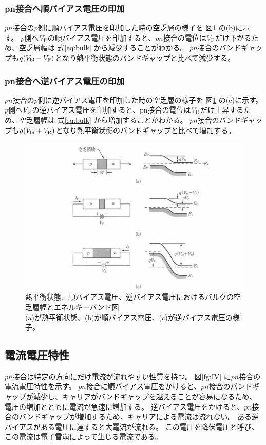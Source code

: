 \subsubsection{pn接合へ順バイアス電圧の印加}
$pn$接合の$p$側に順バイアス電圧を印加した時の空乏層の様子を 図\ref{fg:pn_bias} の(b)に示す。
$p$側へ$V_{\rm{F}}$の順バイアス電圧を印加すると、$pn$接合の電位は$V_{\rm{F}}$だけ下がるため、空乏層幅は 式\ref{eq:bulk} から減少することがわかる。
$pn$接合のバンドギャップも$q(V_{\rm{bi}}-V_{\rm{F}})$となり熱平衡状態のバンドギャップと比べて減少する。

\subsubsection{pn接合へ逆バイアス電圧の印加}
$pn$接合の$p$側に逆バイアス電圧を印加した時の空乏層の様子を 図\ref{fg:pn_bias} の(c)に示す。
$p$側へ$V_{\rm{R}}$の逆バイアス電圧を印加すると、pn接合の電位は$V_{\rm{R}}$だけ上昇するため、空乏層幅は 式\ref{eq:bulk} から増加することがわかる。
$pn$接合のバンドギャップも$q(V_{\rm{bi}}+V_{\rm{R}})$となり熱平衡状態のバンドギャップと比べて増加する。

\begin{figure}[h]
    \centering
    \includegraphics[width=12cm]{fig/ch2/pn_bias.jpg}
    \caption[熱平衡状態、順バイアス電圧、逆バイアス電圧におけるバルクの空乏層幅とエネルギーバンド図\cite{sze2012semiconductor}]{熱平衡状態、順バイアス電圧、逆バイアス電圧におけるバルクの空乏層幅とエネルギーバンド図\cite{sze2012semiconductor}\\(a)が熱平衡状態、(b)が順バイアス電圧、(c)が逆バイアス電圧の様子。}
    \label{fg:pn_bias}
\end{figure}

\subsection{電流電圧特性}
$pn$接合は特定の方向にだけ電流が流れやすい性質を持つ。
図\ref{fg:IV} に$pn$接合の電流電圧特性を示す。
$pn$接合に順バイアス電圧をかけると、$pn$接合のバンドギャップが減少し、キャリアがバンドギャップを越えることが容易になるため、電圧の増加とともに電流が急速に増加する。
逆バイアス電圧をかけると、$pn$接合のバンドギャップが増加するため、キャリアによる電流は流れない。
ある逆バイアスがある電圧に達すると大電流が流れる。
この電圧を降伏電圧と呼び、この電流は電子雪崩によって生じる電流である。

